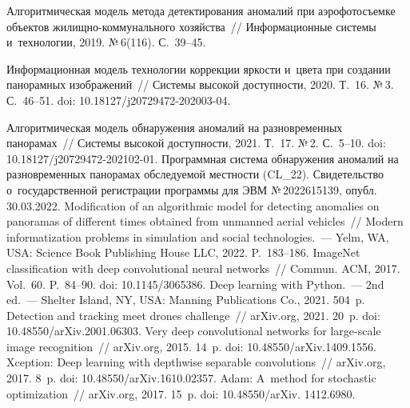 \begin{multicols}{2}
  
{\small\frenchspacing
 {\baselineskip=10.5pt
 \begin{thebibliography}{99}
 

 Алгоритмическая модель метода детектирования 
аномалий при аэрофотосъемке объектов жи\-лищ\-но-ком\-му\-наль\-но\-го хозяйства~// 
Информационные сис\-те\-мы и~технологии, 2019. №\,6(116). С.~39--45.

 Информационная модель технологии коррекции яр\-кости и~цвета при создании панорамных изоб\-ра\-же\-ний~// 
Сис\-те\-мы высокой до\-ступ\-ности, 
2020. Т.~16. №\,3. С.~46--51. doi: 10.18127/j20729472-202003-04.

 Алгоритмическая модель обнаружения аномалий на 
разновременных панорамах~// Сис\-те\-мы высокой до\-ступ\-ности, 2021. Т.~17. №\,2.  
С.~5--10. doi: 10.18127/j20729472-202102-01.
 Программная сис\-те\-ма обнаружения 
аномалий на разновременных панорамах об\-сле\-ду\-емой мест\-ности (CL\_22). Свидетельство 
о~государственной регистрации программы для ЭВМ №\,2022615139, опубл. 30.03.2022.
 Modification of an algorithmic model for 
detecting anomalies on panoramas of different times obtained from unmanned aerial vehicles~// 
Modern informatization problems in simulation and social technologies.~--- Yelm, WA, USA: 
Science Book Publishing House LLC, 2022. P.~183--186.
 ImageNet classification with deep convolutional 
neural networks~// Commun. ACM, 2017. Vol.~60. P.~84--90. doi: 10.1145/3065386.
 Deep learning with Python.~--- 2nd ed.~--- Shelter Island, NY, USA: Manning 
Publications Co., 2021. 504~p.
 Detection and tracking meet 
drones challenge~// arXiv.org, 2021. 20~p. doi: 10.48550/arXiv.2001.06303.
 Very deep convolutional networks for large-scale image 
recognition~// arXiv.org, 2015. 14~p. doi: 10.48550/arXiv.1409.1556.
 Xception: Deep learning with depthwise separable convolutions~// arXiv.org, 2017. 8~p. doi: 10.48550/\linebreak arXiv.1610.02357.
 Adam: A~method for stochastic optimization~// arXiv.org, 2017. 15~p. doi: 
10.48550/arXiv. 1412.6980.
\end{thebibliography}

 }
 }

\end{multicols}

